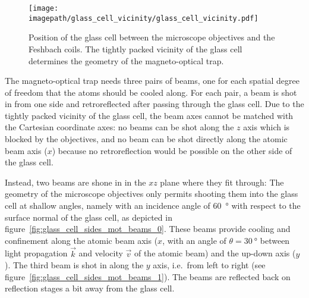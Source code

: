 \begin{figure}
    \centering
    \texttt{[image: \\imagepath/glass\_cell\_vicinity/glass\_cell\_vicinity.pdf]}
    \caption{Position of the glass cell between the microscope objectives and the Feshbach coils. The tightly packed vicinity of the glass cell determines the geometry of the magneto-optical trap.}\label{fig:glass_cell_vicinity}
\end{figure}

The magneto-optical trap needs three pairs of beams, one for each spatial degree of freedom that the atoms should be cooled along. For each pair, a beam is shot in from one side and retroreflected after passing through the glass cell. Due to the tightly packed vicinity of the glass cell, the beam axes cannot be matched with the Cartesian coordinate axes: no beams can be shot along the $z$ axis which is blocked by the objectives, and no beam can be shot directly along the atomic beam axis ($x$) because no retroreflection would be possible on the other side of the glass cell.

Instead, two beams are shone in in the $xz$ plane where they fit through: The geometry of the microscope objectives only permits shooting them into the glass cell at shallow angles, namely with an incidence angle of \SI{60}{\degree} with respect to the surface normal of the glass cell, as depicted in figure~\ref{fig:glass_cell_sides_mot_beams_0}. These beams provide cooling and confinement along the atomic beam axis ($x$, with an angle of $\theta = \SI{30}{\degree}$ between light propagation $\vec k$ and velocity $\vec v$ of the atomic beam) and the up-down axis ($y$). The third beam is shot in along the $y$ axis, i.e.\ from left to right (see figure~\ref{fig:glass_cell_sides_mot_beams_1}). The beams are reflected back on reflection stages a bit away from the glass cell.

